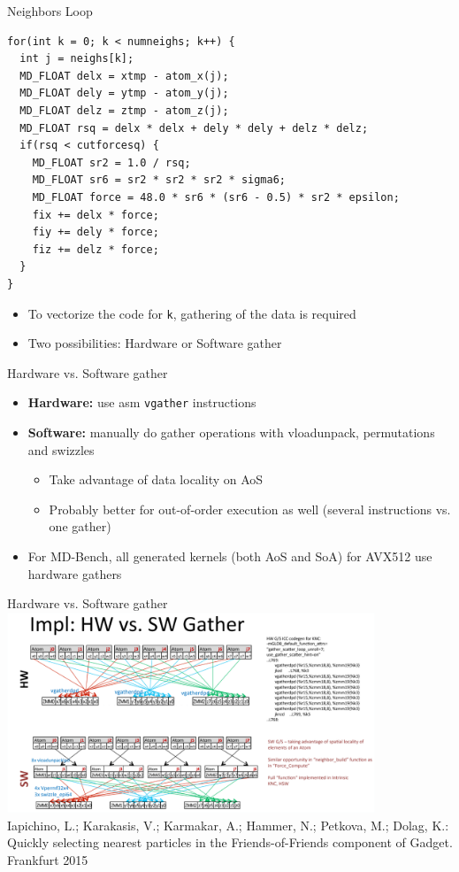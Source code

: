\documentclass[aspectratio=169,t]{beamer}
\begin{document}
  \begin{frame}[fragile]{Neighbors Loop}
    \begin{lstlisting}
for(int k = 0; k < numneighs; k++) {
  int j = neighs[k];
  MD_FLOAT delx = xtmp - atom_x(j);
  MD_FLOAT dely = ytmp - atom_y(j);
  MD_FLOAT delz = ztmp - atom_z(j);
  MD_FLOAT rsq = delx * delx + dely * dely + delz * delz;
  if(rsq < cutforcesq) {
    MD_FLOAT sr2 = 1.0 / rsq;
    MD_FLOAT sr6 = sr2 * sr2 * sr2 * sigma6;
    MD_FLOAT force = 48.0 * sr6 * (sr6 - 0.5) * sr2 * epsilon;
    fix += delx * force;
    fiy += dely * force;
    fiz += delz * force;
  }
}
    \end{lstlisting}
    \begin{itemize}
      \item To vectorize the code for \texttt{k}, gathering of the data is required
      \item Two possibilities: Hardware or Software gather
    \end{itemize}
  \end{frame}

  \begin{frame}[fragile]{Hardware vs. Software gather}
    \begin{itemize}
      \item \textbf{Hardware:} use asm \texttt{vgather} instructions
      \item \textbf{Software:} manually do gather operations with vloadunpack, permutations and swizzles
      \begin{itemize}
        \item Take advantage of data locality on AoS
        \item Probably better for out-of-order execution as well (several instructions vs. one gather)
      \end{itemize}
      \item For MD-Bench, all generated kernels (both AoS and SoA) for AVX512 use hardware gathers
    \end{itemize}
  \end{frame}

  \begin{frame}[fragile]{Hardware vs. Software gather}
  \centering
    \includegraphics[width=11cm]{hw_vs_sw_gather_md.png}
    \\Iapichino, L.; Karakasis, V.; Karmakar, A.; Hammer, N.; Petkova, M.; Dolag, K.: Quickly selecting nearest particles in the Friends-of-Friends component of Gadget. Frankfurt 2015
  \end{frame}
\end{document}
